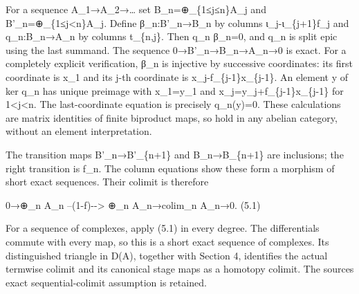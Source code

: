 \documentclass[11pt]{article}
\begin{document}
For a sequence A\_\allowbreak{}1\allowbreak{}→A\_\allowbreak{}2\allowbreak{}→… set B\_\allowbreak{}n\allowbreak{}=\allowbreak{}⊕\_\allowbreak{}\{1≤j≤n\}A\_\allowbreak{}j and B'\_\allowbreak{}n\allowbreak{}=\allowbreak{}⊕\_\allowbreak{}\{1≤j<n\}A\_\allowbreak{}j. Define β\_\allowbreak{}n:\allowbreak{}B'\_\allowbreak{}n\allowbreak{}→B\_\allowbreak{}n by columns ι\_\allowbreak{}j-ι\_\allowbreak{}\{j\allowbreak{}+1\}f\_\allowbreak{}j and q\_\allowbreak{}n:\allowbreak{}B\_\allowbreak{}n\allowbreak{}→A\_\allowbreak{}n by columns t\_\allowbreak{}\{n,\allowbreak{}j\}. Then q\_\allowbreak{}n β\_\allowbreak{}n\allowbreak{}=0,\allowbreak{} and q\_\allowbreak{}n is split epic using the last summand. The sequence 0\allowbreak{}→B'\_\allowbreak{}n\allowbreak{}→B\_\allowbreak{}n\allowbreak{}→A\_\allowbreak{}n\allowbreak{}→0 is exact. For a completely explicit verification,\allowbreak{} β\_\allowbreak{}n is injective by successive coordinates:\allowbreak{} its first coordinate is x\_\allowbreak{}1 and its j-th coordinate is x\_\allowbreak{}j-f\_\allowbreak{}\{j-1\}x\_\allowbreak{}\{j-1\}. An element y of ker q\_\allowbreak{}n has unique preimage with x\_\allowbreak{}1\allowbreak{}=y\_\allowbreak{}1 and x\_\allowbreak{}j\allowbreak{}=y\_\allowbreak{}j\allowbreak{}+f\_\allowbreak{}\{j-1\}x\_\allowbreak{}\{j-1\} for 1\textless j\textless n. The last-coordinate equation is precisely q\_\allowbreak{}n(y)\allowbreak{}\allowbreak{}=0. These calculations are matrix identities of finite biproduct maps,\allowbreak{} so hold in any abelian category,\allowbreak{} without an element interpretation.

The transition maps B'\_\allowbreak{}n\allowbreak{}→B'\_\allowbreak{}\{n\allowbreak{}+1\} and B\_\allowbreak{}n\allowbreak{}→B\_\allowbreak{}\{n\allowbreak{}+1\} are inclusions; the right transition is f\_\allowbreak{}n. The column equations show these form a morphism of short exact sequences. Their colimit is therefore

0\allowbreak{}→\allowbreak{}⊕\_\allowbreak{}n A\_\allowbreak{}n --(1-f)\allowbreak{}-\allowbreak{}-> \allowbreak{}⊕\_\allowbreak{}n A\_\allowbreak{}n\allowbreak{}→colim\_\allowbreak{}n A\_\allowbreak{}n\allowbreak{}→0. (5.1)\allowbreak{}

For a sequence of complexes,\allowbreak{} apply (5.1)\allowbreak{} in every degree. The differentials commute with every map,\allowbreak{} so this is a short exact sequence of complexes. Its distinguished triangle in D(A)\allowbreak{},\allowbreak{} together with Section 4,\allowbreak{} identifies the actual termwise colimit and its canonical stage maps as a homotopy colimit. The source\textquotesingle s exact sequential-colimit assumption is retained.
\end{document}
